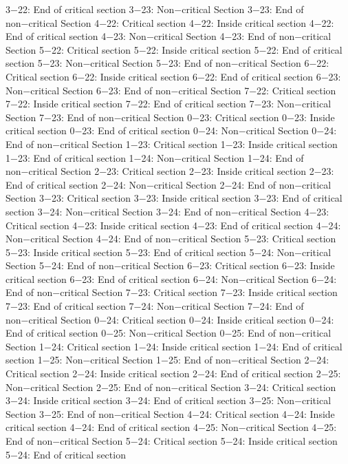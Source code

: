 3−22: End of critical section
3−23: Non−critical Section
3−23: End of non−critical Section
4−22: Critical section
4−22: Inside critical section
4−22: End of critical section
4−23: Non−critical Section
4−23: End of non−critical Section
5−22: Critical section
5−22: Inside critical section
5−22: End of critical section
5−23: Non−critical Section
5−23: End of non−critical Section
6−22: Critical section
6−22: Inside critical section
6−22: End of critical section
6−23: Non−critical Section
6−23: End of non−critical Section
7−22: Critical section
7−22: Inside critical section
7−22: End of critical section
7−23: Non−critical Section
7−23: End of non−critical Section
0−23: Critical section
0−23: Inside critical section
0−23: End of critical section
0−24: Non−critical Section
0−24: End of non−critical Section
1−23: Critical section
1−23: Inside critical section
1−23: End of critical section
1−24: Non−critical Section
1−24: End of non−critical Section
2−23: Critical section
2−23: Inside critical section
2−23: End of critical section
2−24: Non−critical Section
2−24: End of non−critical Section
3−23: Critical section
3−23: Inside critical section
3−23: End of critical section
3−24: Non−critical Section
3−24: End of non−critical Section
4−23: Critical section
4−23: Inside critical section
4−23: End of critical section
4−24: Non−critical Section
4−24: End of non−critical Section
5−23: Critical section
5−23: Inside critical section
5−23: End of critical section
5−24: Non−critical Section
5−24: End of non−critical Section
6−23: Critical section
6−23: Inside critical section
6−23: End of critical section
6−24: Non−critical Section
6−24: End of non−critical Section
7−23: Critical section
7−23: Inside critical section
7−23: End of critical section
7−24: Non−critical Section
7−24: End of non−critical Section
0−24: Critical section
0−24: Inside critical section
0−24: End of critical section
0−25: Non−critical Section
0−25: End of non−critical Section
1−24: Critical section
1−24: Inside critical section
1−24: End of critical section
1−25: Non−critical Section
1−25: End of non−critical Section
2−24: Critical section
2−24: Inside critical section
2−24: End of critical section
2−25: Non−critical Section
2−25: End of non−critical Section
3−24: Critical section
3−24: Inside critical section
3−24: End of critical section
3−25: Non−critical Section
3−25: End of non−critical Section
4−24: Critical section
4−24: Inside critical section
4−24: End of critical section
4−25: Non−critical Section
4−25: End of non−critical Section
5−24: Critical section
5−24: Inside critical section
5−24: End of critical section
